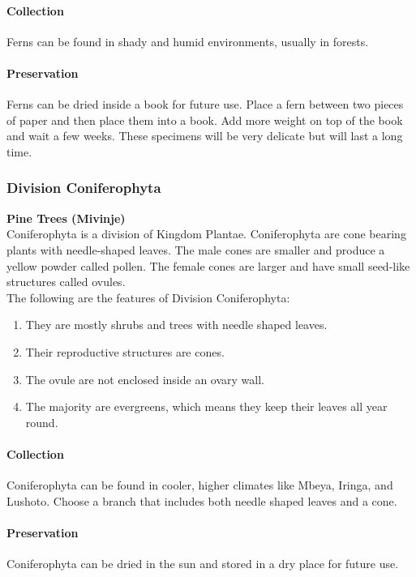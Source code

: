 \begin{multicols}{2}
\paragraph{Collection}
Ferns can be found in shady and humid environments, usually in forests. 

\paragraph{Preservation} 
Ferns can be dried inside a book for future use. Place a fern between two pieces of paper and then place them into a book. Add more weight on top of the book and wait a few weeks. These specimens will be very delicate but will last a long time.

\subsubsection{Division Coniferophyta}
\textbf{Pine Trees (Mivinje)}\\
 Coniferophyta is a division of Kingdom Plantae. Coniferophyta are cone bearing plants with needle-shaped leaves. The male cones are smaller and produce a yellow powder called pollen. The female cones are larger and have small seed-like structures called ovules.\\
The following are the features of Division Coniferophyta:
\begin{enumerate}
\item{They are mostly shrubs and trees with needle shaped leaves.}
\item{Their reproductive structures are cones.}
\item{The ovule are not enclosed inside an ovary wall.}
\item{The majority are evergreens, which means they keep their leaves all year round.}
\end{enumerate}

\paragraph{Collection}
Coniferophyta can be found in cooler, higher climates like Mbeya, Iringa, and Lushoto. Choose a branch that includes both needle shaped leaves and a cone.

\paragraph{Preservation} 
Coniferophyta can be dried in the sun and stored in a dry place for future use.


\end{multicols}
